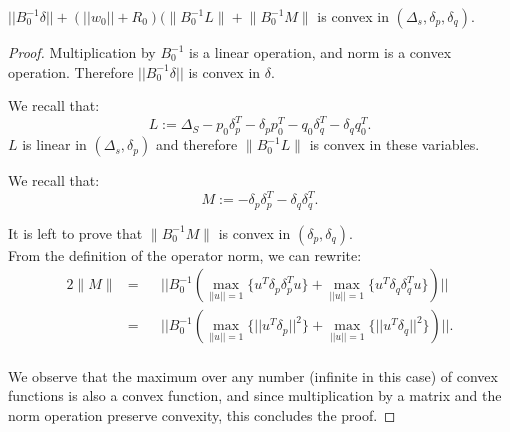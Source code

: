 \begin{lemma} \label{GisConvex}
$||B_0^{-1}\delta|| + (||w_0||+R_0)(\Big \|B_0^{-1}L\Big \|+\Big \|B_0^{-1}M\Big \|$ is convex in $(\Delta_s,\delta_p, \delta_q).$
\end{lemma}
\begin{proof}
Multiplication by $B_0^{-1}$ is a linear operation, and norm is a convex
operation. Therefore $||B_0^{-1}\delta||$ is convex in $\delta$.

We recall that:
\begin{equation*}
L:= \Delta_S - p_0\delta_p^T - \delta_pp_0^T - q_0\delta_q^T - \delta_qq_0^T.
\end{equation*}
$L$ is linear in $(\Delta_s, \delta_p)$ and therefore $\Big \|B_0^{-1}L\Big \|$ is convex in these variables.


We recall that:
\begin{equation*}
M:= - \delta_p\delta_p^T - \delta_q\delta_q^T.
\end{equation*}

It is left to prove that $\Big \|B_0^{-1}M\Big \|$ is convex in $(\delta_p, \delta_q)$.
\\From the definition of the operator norm, we can rewrite:
\begin{alignat*} {2}
\Big \|M \Big \| & = && ||B_0^{-1}(\max_{||u||=1}{\{u^T \delta_p\delta_p^T u\}} +
\max_{||u||=1}{\{u^T \delta_q\delta_q^T u\}})||\\
& = && ||B_0^{-1}(\max_{||u||=1}{\{||u^T \delta_p||^2\}} +
\max_{||u||=1}{\{||u^T \delta_q||^2\}})||.
\end{alignat*}
\\We observe that the maximum over any number (infinite in this case) of convex functions
 is also a convex
function, and since multiplication by a matrix and the norm
operation preserve convexity, this concludes the proof.
\end{proof}

